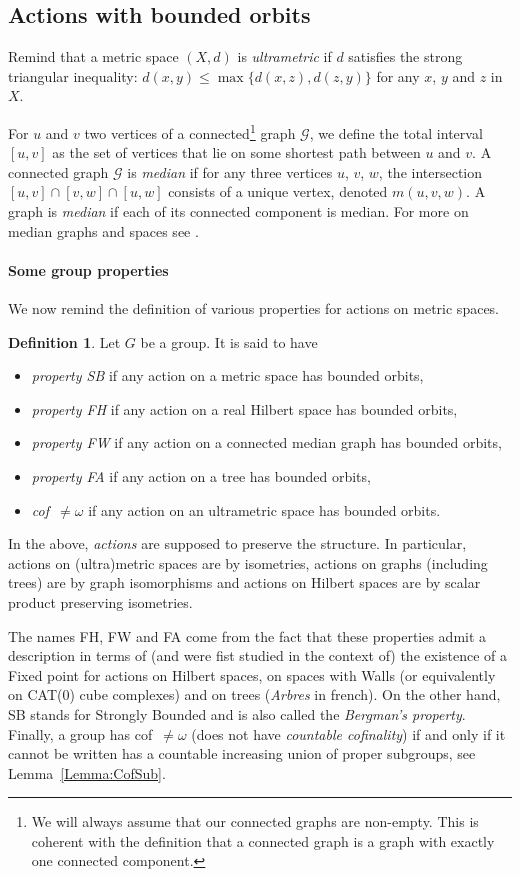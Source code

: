 \documentclass[a4paper]{article}
\newcounter{mycomment}
\newcommand{\mycomment}[2][]{\refstepcounter{mycomment}{\todo[color={green!33},size=\small]{\textbf{Commentaire [\uppercase{#1}\themycomment]:}~#2}}}
\newcommand{\PH}[1]{\todo[color={blue!33},size=small]{#1}}
\newcommand{\GS}[1]{\mycomment[GS]{#1}}
\theoremstyle{definition}
\newtheorem{defn}[lem]{Definition}
\begin{document}
\subsection{Actions with bounded orbits}
%
%
%
Remind that a metric space $(X,d)$ is \emph{ultrametric} if $d$ satisfies the strong triangular inequality: $d(x,y)\leq\max\{d(x,z),d(z,y)\}$ for any $x$, $y$ and $z$ in $X$. 

For $u$ and $v$ two vertices of a connected\footnote{We will always assume that our connected graphs are non-empty. This is coherent with the definition that a connected graph is a graph with exactly one connected component.} graph $\mathcal G$, we define the total interval $[u,v]$ as the set of vertices that lie on some shortest path between $u$ and $v$.
A connected graph $\mathcal G$ is \emph{median} if for any three vertices $u$, $v$, $w$, the intersection $[u,v]\cap[v,w]\cap[u,w]$ consists of a unique vertex, denoted $m(u,v,w)$.
A graph is \emph{median} if each of its connected component is median. For more on median graphs and spaces see \cite{MR2405677,MR2671183,MR1705337}.
%
%
%
%
\paragraph{Some group properties}
We now remind the definition of various properties for actions on metric spaces.
%
%
\begin{defn}\label{Def:FHFA}
Let $G$ be a group.
It is said to have
\begin{itemize}
\item\emph{property SB} if any action on a metric space has bounded orbits,
\item \emph{property FH} if any action on a real Hilbert space has bounded orbits,
\item
\emph{property FW} if any action on a connected median graph has bounded orbits,
\item
\emph{property FA} if any action on a tree has bounded orbits,
\item
\emph{cof~$\neq\omega$} if any action on an ultrametric space has bounded orbits.
\end{itemize}
In the above, \emph{actions} are supposed to preserve the structure. In particular, actions on (ultra)metric spaces are by isometries, actions on graphs (including trees) are by graph isomorphisms and actions on Hilbert spaces are by scalar product preserving isometries.
\end{defn}
%
%
The names FH, FW and FA come from the fact that these properties admit a description in terms of (and were fist studied in the context of) the existence of a Fixed point for actions on Hilbert spaces, on spaces with Walls (or equivalently on CAT(0) cube complexes) and on trees (\emph{Arbres} in french).
On the other hand, SB stands for Strongly Bounded and is also called the \emph{Bergman's property}.
Finally, a group has cof~$\neq\omega$ (does not have \emph{countable cofinality}) if and only if it cannot be written has a countable increasing union of proper subgroups, see Lemma~\ref{Lemma:CofSub}.
\end{document}

